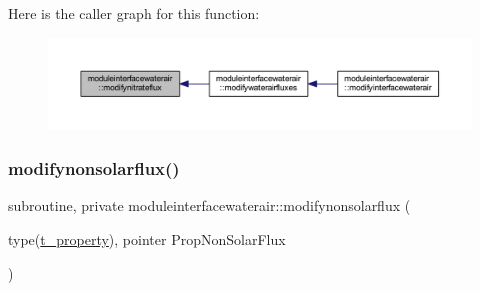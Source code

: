 Here is the caller graph for this function\+:\nopagebreak
\begin{figure}[H]
\begin{center}
\leavevmode
\includegraphics[width=350pt]{namespacemoduleinterfacewaterair_ac260263b243a28d2d9eb0dce7188d3b0_icgraph}
\end{center}
\end{figure}
\mbox{\label{namespacemoduleinterfacewaterair_a9ae768b301ebc2c73524836b992b568d}} 
\subsubsection{\texorpdfstring{modifynonsolarflux()}{modifynonsolarflux()}}
{\footnotesize\ttfamily subroutine, private moduleinterfacewaterair\+::modifynonsolarflux (\begin{DoxyParamCaption}\item[{type(\mbox{\hyperlink{structmoduleinterfacewaterair_1_1t__property}{t\+\_\+property}}), pointer}]{Prop\+Non\+Solar\+Flux }\end{DoxyParamCaption})\hspace{0.3cm}{\ttfamily [private]}}

